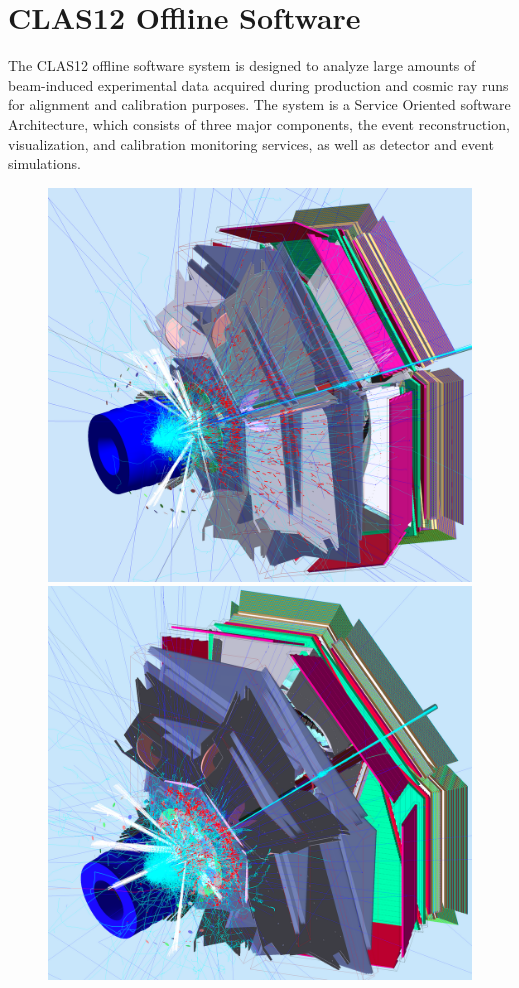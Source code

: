 \documentclass[final,3p,twocolumn]{elsarticle}
\begin{document}
\section{CLAS12 Offline Software}  
The CLAS12 offline software system is designed to analyze large amounts of beam-induced experimental data acquired during production and cosmic ray runs for alignment and calibration purposes. The system is a Service Oriented software Architecture, which consists of three major components, the event reconstruction, visualization, and calibration
monitoring services, as well as detector and event simulations.  
%
\begin{figure}[htbp!]
\centerline{\includegraphics[width=1.0\columnwidth]{50percentNoSolenoidNoTorus1.png}
\includegraphics[width=1.0\columnwidth]{50percentNoSolenoid2a.png}}

\end{figure}
\end{document}
